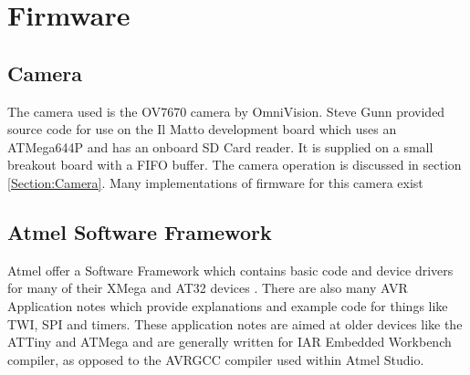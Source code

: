 

\section{Firmware}
\subsection{Camera}

The camera used is the OV7670 camera by OmniVision. Steve Gunn provided source code for use on the Il Matto development board which uses an ATMega644P and has an onboard SD Card reader. It is supplied on a small breakout board with a FIFO buffer. The camera operation is discussed in section \ref{Section:Camera}. Many implementations of firmware for this camera exist

\subsection{Atmel Software Framework}

Atmel offer a Software Framework which contains basic code and device drivers for many of their XMega and AT32 devices \cite{Atmel:ASF}. There are also many AVR Application notes which provide explanations and example code for things like TWI, SPI and timers. These application notes are aimed at older devices like the ATTiny and ATMega and are generally written for IAR Embedded Workbench compiler, as opposed to the AVRGCC compiler used within Atmel Studio. 

